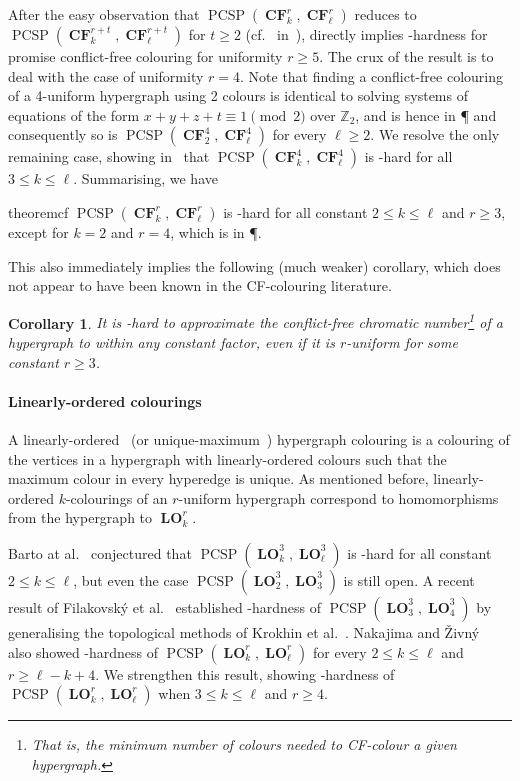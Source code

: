 \documentclass[a4paper,11pt]{article}
\newcommand{\2}{\vec{2}}
\newcommand{\1}{\vec{1}}
\newcommand{\0}{\vec{0}}
\DeclareMathOperator{\PCSP}{PCSP}
\DeclareMathOperator{\CF}{\mathbf{CF}}
\DeclareMathOperator{\LO}{\mathbf{LO}}
\theoremstyle{plain}
\newtheorem{corollary}[theorem]{Corollary}
\theoremstyle{definition}
\begin{document}
After the easy observation that $\PCSP(\CF_k^r, \CF_\ell^r)$ reduces to $\PCSP(\CF_k^{r + t}, \CF_\ell^{r + t})$ for $t \geq 2$ (cf.~ in~),  directly implies \NP-hardness for promise conflict-free colouring for uniformity $r\geq 5$.
The crux of the result is to deal with the case of uniformity $r=4$.
Note that finding a conflict-free colouring of a 4-uniform hypergraph using 2
colours is identical to solving systems of equations of the form $x + y + z + t \equiv 1 \pmod{2}$ over $\mathbb{Z}_2$, and is hence in \P{} and consequently so is $\PCSP(\CF_2^4, \CF_\ell^4)$ for every $\ell\geq 2$. 
We resolve the only remaining case, showing in~ that $\PCSP(\CF_k^4, \CF_\ell^4)$ is \NP-hard for all $3 \leq k \leq \ell$.
Summarising, we have
\begin{restatable}{theorem}{cf}\label{thm:cf}
$\PCSP(\CF_k^r, \CF_\ell^r)$ is \NP-hard  for all constant $2 \leq k \leq \ell$ and $r \geq 3$, except for $k=2$ and $r=4$, which is in \P.
\end{restatable}

This also immediately implies the following (much weaker) corollary, which does not appear to have been known in the CF-colouring literature.

\begin{corollary}
    It is \NP-hard to approximate the conflict-free chromatic
    number\footnote{That is, the minimum number of colours needed to CF-colour
    a given hypergraph.} of a hypergraph to within any constant factor, even if it
    is $r$-uniform for some constant $r \geq 3$.
\end{corollary}


\paragraph{Linearly-ordered colourings}

A linearly-ordered~\cite{Barto21:stacs} (or
unique-maximum~\cite{Cheilaris13:sidma}) hypergraph colouring is a colouring of
the vertices in a hypergraph with linearly-ordered colours such that the maximum
colour in every hyperedge is unique.
As mentioned before, linearly-ordered $k$-colourings of an $r$-uniform hypergraph correspond to homomorphisms from the hypergraph to $\LO^r_k$.

Barto at al.~\cite{Barto21:stacs} conjectured that $\PCSP(\LO_k^3,\LO_\ell^3)$
is \NP-hard for all constant $2\leq k\leq \ell$, but even the case
$\PCSP(\LO_2^3,\LO_3^3)$ is still open. A recent result of Filakovsk\'y et
al.~\cite{fnotw24:stacs} established \NP-hardness of $\PCSP(\LO_3^3,\LO_4^3)$ by generalising the topological methods of Krokhin et al.~\cite{KOWZ23}.
Nakajima and \v{Z}ivn\'y~\cite{NZ23:toct} also showed \NP-hardness of
$\PCSP(\LO_k^r,\LO_\ell^r)$ for every $2\leq k\leq \ell$ and $r\geq \ell-k+4$. We strengthen this result, showing \NP-hardness of $\PCSP(\LO_k^r,\LO_\ell^r)$ when $3 \leq k \leq \ell$ and $r \geq 4$.
\end{document}
